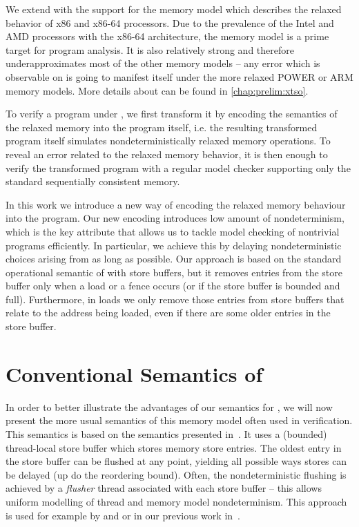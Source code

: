 We extend \divine with the support for the \xtso memory model 
which describes the relaxed behavior of x86 and x86-64 processors.
Due to the prevalence of the Intel and AMD processors with the x86-64
architecture, the \xtso memory model is a prime target for program analysis.
It is also relatively strong and therefore underapproximates most of the other
memory models -- any error which is observable on \xtso is going to manifest
itself under the more relaxed POWER or ARM memory models.
More details about \xtso can be found in \autoref{chap:prelim:xtso}.

To verify a program under \xtso, we first transform it by encoding the
semantics of the relaxed memory into the program itself, i.e. the resulting
transformed program itself simulates nondeterministically relaxed memory
operations.
To reveal an error related to the relaxed memory behavior, it is then enough to
verify the transformed program with a regular model checker supporting only the
standard sequentially consistent memory.

In this work we introduce a new way of encoding the relaxed memory behaviour
into the program.
Our new encoding introduces low amount of nondeterminism, which is the key
attribute that allows us to tackle model checking of nontrivial programs
efficiently.
In particular, we achieve this by delaying nondeterministic choices arising
from \xtso as long as possible.
Our approach is based on the standard operational semantic of \xtso with store
buffers, but it removes entries from the store buffer only when a load or a
fence occurs (or if the store buffer is bounded and full).
Furthermore, in loads we only remove those entries from store buffers that
relate to the address being loaded, even if there are some older entries in the
store buffer.



\section{Conventional Semantics of \xtso}

In order to better illustrate the advantages of our semantics for \xtso, we
will now present the more usual semantics of this memory model often used in
verification.
This semantics is based on the \xtso semantics presented in~.
It uses a (bounded) thread-local store buffer which stores memory store entries.
The oldest entry in the store buffer can be flushed at any point, yielding all
possible ways stores can be delayed (up do the reordering bound).
Often, the nondeterministic flushing is achieved by a \emph{flusher} thread
associated with each store buffer -- this allows uniform modelling of thread
and memory model nondeterminism.
This approach is used for example by  and 
or in our previous work in~.


